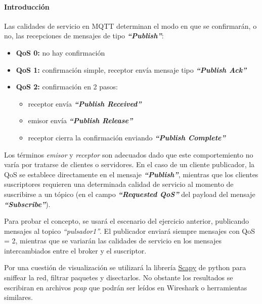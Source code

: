 \documentclass[11pt]{article}
\begin{document}
    \hypertarget{introducciuxf3n}{%
\paragraph{Introducción\\}\label{introducciuxf3n}}

Las calidades de servicio en MQTT determinan el modo en que se
confirmarán, o no, las recepciones de mensajes de tipo
\textbf{\emph{``Publish''}}:

\begin{itemize}
\item
  \textbf{QoS 0:} no hay confirmación
\item
  \textbf{QoS 1:} confirmación simple, receptor envía mensaje tipo
  \textbf{\emph{``Publish Ack''}}
\item
  \textbf{QoS 2:} confirmación en 2 pasos:

  \begin{itemize}
  \item
    receptor envía \textbf{\emph{``Publish Received''}}
  \item
    emisor envía \textbf{\emph{``Publish Release''}}
  \item
    receptor cierra la confirmación enviando \textbf{\emph{``Publish
    Complete''}}
  \end{itemize}
\end{itemize}

Los términos \emph{emisor} y \emph{receptor} son adecuados dado que este
comportemiento no varía por tratarse de clientes o servidores. En el
caso de un cliente publicador, la QoS se establece directamente en el
mensaje \textbf{\emph{``Publish''}}, mientras que los clientes
suscriptores requieren una determinada calidad de servicio al momento de
suscribirse a un tópico (en el campo \textbf{\emph{``Requested QoS''}}
del payload del mensaje \textbf{\emph{``Subscribe''}}).

Para probar el concepto, se usará el escenario del ejercicio anterior,
publicando mensajes al topico \emph{``pulsador1''}. El publicador
enviará siempre mensajes con QoS = 2, mientras que se variarán las
calidades de servicio en los mensajes intercambiados entre el broker y
el suscriptor.

Por una cuestión de visualización se utilizará la librería
\href{https://scapy.net/}{Scapy} de python para sniffear la red, filtrar
paquetes y disectarlos. No obstante los resultados se escribiran en
archivos \emph{pcap} que podrán ser leídos en Wireshark o herramientas
similares.
\end{document}
